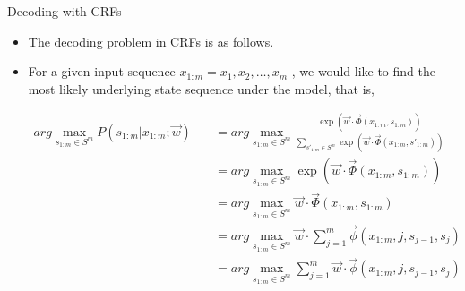 \documentclass[handout]{beamer}
\begin{document}
\begin{frame}{Decoding with CRFs}
\begin{scriptsize}

\begin{itemize}
\item The decoding problem in CRFs is as follows.
\item For a given input sequence $x_{1:m} = x_1 , x_2 , \dots, x_m$ , we would like to find the most likely underlying  state sequence under the model, that is,

\begin{equation}
 \begin{split}
 arg \max_{s_{1:m} \in S^m} P(s_{1:m}| x_{1:m}; \vec{w})  \quad & =  arg \max_{s_{1:m} \in S^m} \frac{\exp (\vec{w} \cdot \vec{\Phi}(x_{1:m},s_{1:m}))}{\sum_{s'_{1:m} \in S^m}\exp (\vec{w} \cdot \vec{\Phi}(x_{1:m},s'_{1:m}))} \\
 \quad & =  arg \max_{s_{1:m} \in S^m} \exp (\vec{w} \cdot \vec{\Phi}(x_{1:m},s_{1:m})) \\
  \quad & =  arg \max_{s_{1:m} \in S^m}  \vec{w} \cdot \vec{\Phi}(x_{1:m},s_{1:m}) \\
    \quad & =  arg \max_{s_{1:m} \in S^m}  \vec{w} \cdot \sum_{j=1}^{m} \vec{\phi}(x_{1:m},j,s_{j-1},s_j) \\
 \quad & =  arg \max_{s_{1:m} \in S^m}  \sum_{j=1}^{m} \vec{w} \cdot \vec{\phi}(x_{1:m},j,s_{j-1},s_j)   
 \end{split}
 \end{equation}




\end{itemize}

\end{scriptsize}
\end{frame}
\end{document}
